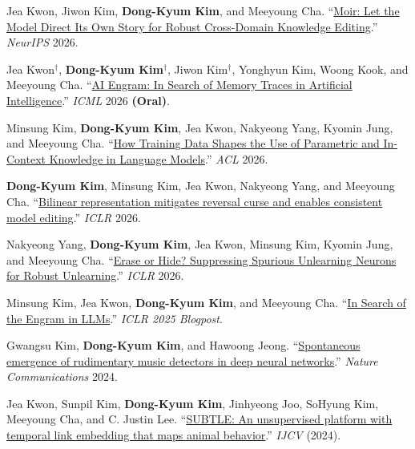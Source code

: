 \documentclass[11pt,letterpaper]{article}
\begin{document}
{\small
\begin{enumerate}[label={[\arabic*]}, leftmargin=20pt, itemsep=2pt]

    \item Jea Kwon, Jiwon Kim, \textbf{Dong-Kyum Kim}, and Meeyoung Cha.
    ``\href{https://arxiv.org/abs/2607.20433}{Moir: Let the Model Direct Its Own Story for Robust Cross-Domain
Knowledge Editing}.''
    \textit{NeurIPS} 2026.

    \item Jea Kwon$^\dagger$, \textbf{Dong-Kyum Kim}$^\dagger$, Jiwon Kim$^\dagger$, Yonghyun Kim, Woong Kook, and Meeyoung Cha.
    ``\href{https://arxiv.org/abs/2606.14997}{AI Engram: In Search of Memory Traces in Artificial Intelligence}.''
    \textit{ICML} 2026 \textbf{(Oral)}.

    \item Minsung Kim, \textbf{Dong-Kyum Kim}, Jea Kwon, Nakyeong Yang, Kyomin Jung, and Meeyoung Cha.
    ``\href{https://arxiv.org/abs/2510.02370}{How Training Data Shapes the Use of Parametric and In-Context Knowledge in
Language Models}.''
    \textit{ACL} 2026.

    \item \textbf{Dong-Kyum Kim}, Minsung Kim, Jea Kwon, Nakyeong Yang, and Meeyoung Cha.
    ``\href{https://arxiv.org/abs/2509.21993}{Bilinear representation mitigates reversal curse and enables consistent
model editing}.''
    \textit{ICLR} 2026.

    \item Nakyeong Yang, \textbf{Dong-Kyum Kim}, Jea Kwon, Minsung Kim, Kyomin Jung, and Meeyoung Cha.
    ``\href{https://arxiv.org/abs/2509.22263}{Erase or Hide? Suppressing Spurious Unlearning Neurons for Robust
Unlearning}.''
    \textit{ICLR} 2026.

    \item Minsung Kim, Jea Kwon, \textbf{Dong-Kyum Kim}, and Meeyoung Cha.
    ``\href{https://d2jud02ci9yv69.cloudfront.net/2025-04-28-engram-172/blog/engram/}{In Search of the Engram in
LLMs}.''
    \textit{ICLR 2025 Blogpost}.

    \item Gwangsu Kim, \textbf{Dong-Kyum Kim}, and Hawoong Jeong.
    ``\href{https://doi.org/10.1038/s41467-023-44516-0}{Spontaneous emergence of rudimentary music detectors in deep
neural networks}.''
    \textit{Nature Communications} 2024.

    \item Jea Kwon, Sunpil Kim, \textbf{Dong-Kyum Kim}, Jinhyeong Joo, SoHyung Kim, Meeyoung Cha, and C. Justin Lee.
    ``\href{https://doi.org/10.1007/s11263-024-02072-0}{SUBTLE: An unsupervised platform with temporal link embedding
that maps animal behavior}.''
    \textit{IJCV} (2024).


\end{enumerate}}
\end{document}
